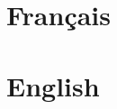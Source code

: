 \documentclass[a4paper, 14px, fleqn]{article}
\begin{document}
    
    \clearpage
    
    \tableofcontents
    \clearpage

    
    \clearpage
    
    \section{Français}
    
    \clearpage

    \section{English}
    
    \clearpage
    
    
\end{document}
